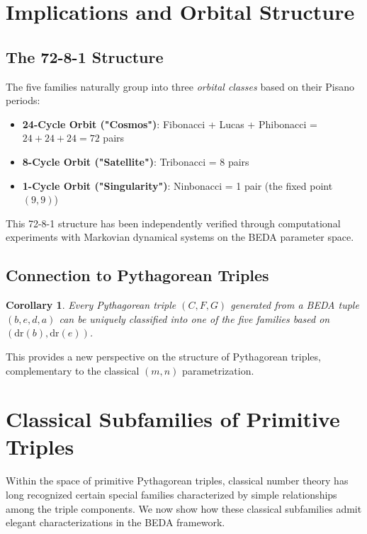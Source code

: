 \documentclass[12pt]{article}
\newtheorem{corollary}[theorem]{Corollary}
\begin{document}
\section{Implications and Orbital Structure}

\subsection{The 72-8-1 Structure}

The five families naturally group into three \emph{orbital classes} based on their Pisano periods:

\begin{itemize}
\item \textbf{24-Cycle Orbit ("Cosmos")}: Fibonacci + Lucas + Phibonacci = $24 + 24 + 24 = 72$ pairs
\item \textbf{8-Cycle Orbit ("Satellite")}: Tribonacci = 8 pairs
\item \textbf{1-Cycle Orbit ("Singularity")}: Ninbonacci = 1 pair (the fixed point $(9,9)$)
\end{itemize}

This 72-8-1 structure has been independently verified through computational experiments with Markovian dynamical systems on the BEDA parameter space.

\subsection{Connection to Pythagorean Triples}

\begin{corollary}
Every Pythagorean triple $(C, F, G)$ generated from a BEDA tuple $(b, e, d, a)$ can be uniquely classified into one of the five families based on $(\text{dr}(b), \text{dr}(e))$.
\end{corollary}

This provides a new perspective on the structure of Pythagorean triples, complementary to the classical $(m, n)$ parametrization.

\section{Classical Subfamilies of Primitive Triples}

Within the space of primitive Pythagorean triples, classical number theory has long recognized certain special families characterized by simple relationships among the triple components. We now show how these classical subfamilies admit elegant characterizations in the BEDA framework.
\end{document}
